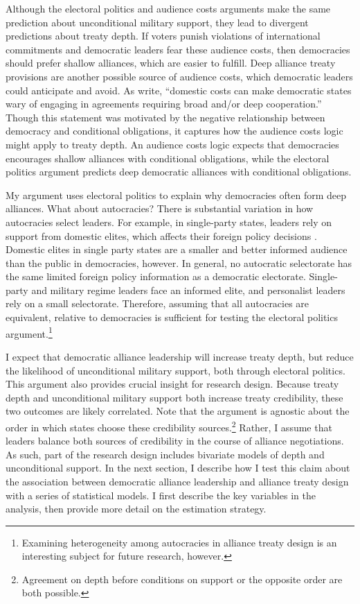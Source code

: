 \documentclass[12pt]{article}
\begin{document}
Although the electoral politics and audience costs arguments make the same prediction about unconditional military support, they lead to divergent predictions about treaty depth. 
If voters punish violations of international commitments and democratic leaders fear these audience costs, then democracies should prefer shallow alliances, which are easier to fulfill. 
Deep alliance treaty provisions are another possible source of audience costs, which democratic leaders could anticipate and avoid.
As \citet[pg. 980]{Chibaetal2015} write, ``domestic costs can make democratic states wary of engaging in agreements requiring broad and/or deep cooperation.''  
Though this statement was motivated by the negative relationship between democracy and conditional obligations, it captures how the audience costs logic might apply to treaty depth. 
An audience costs logic expects that democracies encourages shallow alliances with conditional obligations, while the electoral politics argument predicts deep democratic alliances with conditional obligations. 


My argument uses electoral politics to explain why democracies often form deep alliances. 
What about autocracies? 
There is substantial variation in how autocracies select leaders. 
For example, in single-party states, leaders rely on support from domestic elites, which affects their foreign policy decisions \citep{Weeks2014}.
Domestic elites in single party states are a smaller and better informed audience than the public in democracies, however.   
In general, no autocratic selectorate has the same limited foreign policy information as a democratic electorate.
Single-party and military regime leaders face an informed elite, and personalist leaders rely on a small selectorate. 
Therefore, assuming that all autocracies are equivalent, relative to democracies is sufficient for testing the electoral politics argument.\footnote{Examining heterogeneity among autocracies in alliance treaty design is an interesting subject for future research, however.} 


I expect that democratic alliance leadership will increase treaty depth, but reduce the likelihood of unconditional military support, both through electoral politics. 
This argument also provides crucial insight for research design. 
Because treaty depth and unconditional military support both increase treaty credibility, these two outcomes are likely correlated.
Note that the argument is agnostic about the order in which states choose these credibility sources.\footnote{Agreement on depth before conditions on support or the opposite order are both possible.}
Rather, I assume that leaders balance both sources of credibility in the course of alliance negotiations. 
As such, part of the research design includes bivariate models of depth and unconditional support. 
In the next section, I describe how I test this claim about the association between democratic alliance leadership and alliance treaty design with a series of statistical models. 
I first describe the key variables in the analysis, then provide more detail on the estimation strategy.
\end{document}
